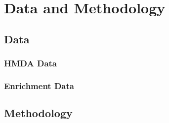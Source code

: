 \chapter{Data and Methodology}\label{ch:Data_and_Methodology}



\section{Data}\label{sec:Data}



\subsection{HMDA Data}\label{subsec:HMDA_Data}



\subsection{Enrichment Data}\label{subsec:Enrichment_Data}



\section{Methodology}\label{sec:Methodology}